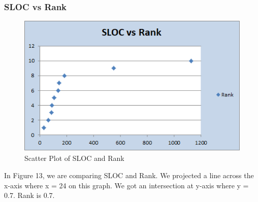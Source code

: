 \documentclass[a4paper, 11pt]{article}
\begin{document}
\subsubsection{SLOC vs Rank}
\begin{figure}[!hbt]
		\begin{center}
		\includegraphics[width=\columnwidth]{Scatter3.png}
		\caption{Scatter Plot of SLOC and Rank}
		\label{fig:figure}
		\end{center}
	\end{figure}
    
In Figure 13, we are comparing SLOC and Rank. We projected a line across the x-axis where x = 24 on this graph. We got an intersection at y-axis where y = 0.7. Rank is 0.7. 
\end{document}
